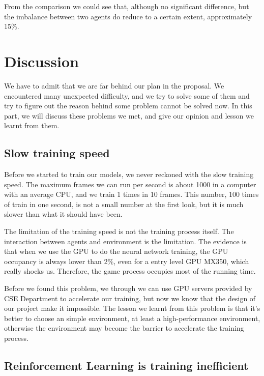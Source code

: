 \documentclass[12pt]{article}
\begin{document}
From the comparison we could see that, although no significant difference, but the imbalance between two agents do reduce to a certain extent, approximately 15\%.


\section{Discussion}

We have to admit that we are far behind our plan in the proposal. We encountered many unexpected difficulty, and we try to solve some of them and try to figure out the reason behind some problem cannot be solved now. In this part, we will discuss these problems we met, and give our opinion and lesson we learnt from them.

\subsection{Slow training speed}
Before we started to train our models, we never reckoned with the slow training speed. The maximum frames we can run per second is about 1000 in a computer with an average CPU, and we train 1 times in 10 frames. This number, 100 times of train in one second, is not a small number at the first look, but it is much slower than what it should have been.

The limitation of the training speed is not the training process itself. The interaction between agents and environment is the limitation. The evidence is that when we use the GPU to do the neural network training, the GPU occupancy is always lower than 2\%, even for a entry level GPU MX350, which really shocks us. Therefore, the game process occupies most of the running time.

Before we found this problem, we through we can use GPU servers provided by CSE Department to accelerate our training, but now we know that the design of our project make it impossible. The lesson we learnt from this problem is that it's better to choose an simple environment, at least a high-performance environment, otherwise the environment may become the barrier to accelerate the training process.

\subsection{Reinforcement Learning is training inefficient}
\end{document}
